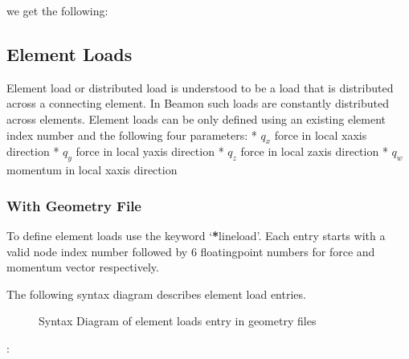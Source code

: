 \documentclass[letterpaper,10pt,english]{sphinxmanual}
\begin{document}
we get the following:

\noindent{}


\subsection{Element Loads}
\label{\detokenize{making_a_model:element-loads}}
Element load or distributed load is understood to be a load that is distributed across a connecting element.
In Beamon such loads are constantly distributed across elements.
Element loads can be only defined using an existing element index number and the following four parameters:
* \(q_x\) force in local x\sphinxhyphen{}axis direction
* \(q_y\) force in local y\sphinxhyphen{}axis direction
* \(q_z\) force in local z\sphinxhyphen{}axis direction
* \(q_w\) momentum in local x\sphinxhyphen{}axis direction


\subsubsection{With Geometry File}
\label{\detokenize{making_a_model:id11}}
To define element loads use the keyword ‘{\color{red}\bfseries{}*}lineload’. Each entry starts with a valid node index number followed by 6
floating\sphinxhyphen{}point numbers for force and momentum vector respectively.

The following syntax diagram describes element load entries.

\begin{figure}[htbp]
\centering
\capstart

\noindent{}
\caption{Syntax Diagram of element loads entry in geometry files}\label{\detokenize{making_a_model:id21}}\end{figure}

:

\begin{sphinxVerbatim}[commandchars=\\\{\}]
\end{sphinxVerbatim}
\end{document}
